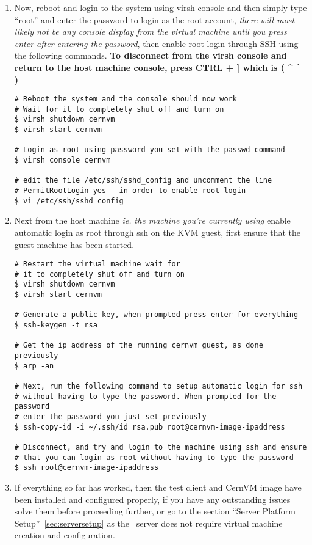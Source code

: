 \begin{enumerate}
\item 	Now, reboot and login to the system using virsh console and then simply type ``root'' and enter the password to login as the 
		root account, \emph{there will most likely not be any console display from the virtual machine until you press 
		enter after entering the password}, then enable root login through SSH using the following commands. {\bf To 
		disconnect from the virsh console and return to the host machine console, press CTRL + ]  which is ( \^~] )}
				
\lstset{language=bash,caption=Enable SSH Root Login}
\begin{lstlisting}
# Reboot the system and the console should now work
# Wait for it to completely shut off and turn on
$ virsh shutdown cernvm
$ virsh start cernvm

# Login as root using password you set with the passwd command
$ virsh console cernvm

# edit the file /etc/ssh/sshd_config and uncomment the line 
# PermitRootLogin yes	in order to enable root login
$ vi /etc/ssh/sshd_config

\end{lstlisting}

\item 	Next from the host machine \emph{ie. the machine you're currently using} enable automatic login as root 
		through ssh on the KVM guest, first ensure that the guest machine has been started.
		
\lstset{language=bash,caption=Enable Automatic SSH Root Login}
\begin{lstlisting}
# Restart the virtual machine wait for 
# it to completely shut off and turn on
$ virsh shutdown cernvm
$ virsh start cernvm

# Generate a public key, when prompted press enter for everything
$ ssh-keygen -t rsa

# Get the ip address of the running cernvm guest, as done previously
$ arp -an

# Next, run the following command to setup automatic login for ssh
# without having to type the password. When prompted for the password
# enter the password you just set previously
$ ssh-copy-id -i ~/.ssh/id_rsa.pub root@cernvm-image-ipaddress
		
# Disconnect, and try and login to the machine using ssh and ensure 
# that you can login as root without having to type the password
$ ssh root@cernvm-image-ipaddress
\end{lstlisting}

\item	If everything so far has worked, then the test client and CernVM image have been installed and configured properly,
		if you have any outstanding issues solve them before proceeding further, or go to the section ``Server Platform 		
		Setup''~\ref{sec:serversetup} as the \tapper~server does not require virtual machine creation and configuration.
\end{enumerate}


